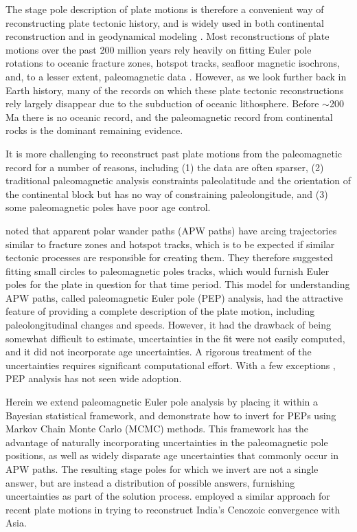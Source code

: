 \documentclass[preprint,12pt,authoryear]{elsarticle}
\begin{document}
The stage pole description of plate motions is therefore a convenient way of reconstructing
plate tectonic history, and is widely used in both continental reconstruction 
\citep[e.g.][]{boyden2011next} and in geodynamical
modeling \citep[e.g.][]{mcnamara2005thermochemical, bull2014effect, rudolph2014history}.
Most reconstructions of plate motions over the past 200 million years rely heavily on fitting Euler pole rotations
to oceanic fracture zones, hotspot tracks, seafloor magnetic isochrons,
and, to a lesser extent, paleomagnetic data \citep{muller1993revised, seton2012global}.
However, as we look further back in Earth history, many of the records on which these
plate tectonic reconstructions rely largely disappear due to the 
subduction of oceanic lithosphere. Before $\sim$200 Ma there is no oceanic record,
and the paleomagnetic record from continental rocks is the dominant remaining evidence.

It is more challenging to reconstruct past plate motions from the paleomagnetic
record for a number of reasons, including 
(1) the data are often sparser,
(2) traditional paleomagnetic analysis constraints paleolatitude and the orientation
of the continental block but has no way of constraining paleolongitude, and
(3) some paleomagnetic poles have poor age control.

\citet{gordon1984paleomagnetic} noted that apparent polar wander paths (APW paths) have 
arcing trajectories similar to fracture zones and hotspot tracks, which is
to be expected if similar tectonic processes are responsible for creating them.
They therefore suggested fitting small circles to paleomagnetic poles tracks,
which would furnish Euler poles for the plate in question for that time period.
This model for understanding APW paths, called paleomagnetic Euler pole (PEP) analysis,
 had the attractive feature of providing a complete description of the plate motion, 
including paleolongitudinal changes and speeds. 
However, it had the drawback of being somewhat difficult to estimate,
uncertainties in the fit were not easily computed, 
and it did not incorporate age uncertainties. 
A rigorous treatment of the uncertainties requires significant computational effort.
With a few exceptions \citep[e.g.][]{beck1989paleomagnetism, tarling1996palaeomagnetic, bryan1986rotation, beck2003absolute, smirnov2010co},
PEP analysis has not seen wide adoption.

Herein we extend paleomagnetic Euler pole analysis by placing it within
a Bayesian statistical framework, and demonstrate how to invert for PEPs
using Markov Chain Monte Carlo (MCMC) methods. This framework has the advantage
of naturally incorporating uncertainties in the paleomagnetic pole positions,
as well as widely disparate age uncertainties that commonly occur in APW paths.
The resulting stage poles for which we invert are not a single answer, but are instead
a distribution of possible answers, furnishing uncertainties as part of the solution process.
\citet{iaffaldano2012reconstructing} employed a similar approach for recent 
plate motions in trying to reconstruct India's Cenozoic convergence with Asia.
\end{document}
